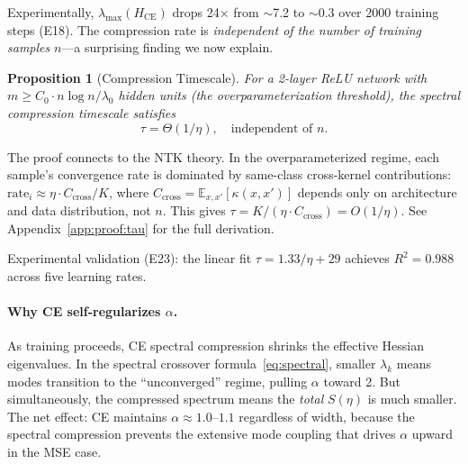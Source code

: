 \documentclass[11pt]{article}
\newcommand{\expect}{\mathbb{E}}
\newcommand{\lr}{\eta}                    %
\newcommand{\drexp}{\alpha}               %
\newcommand{\imbal}{S}                    %
\newcommand{\hwidth}{m}                   %
\newcommand{\nsamples}{n}                 %
\newcommand{\nclasses}{K}                 %
\newcommand{\spectau}{\tau}               %
\newtheorem{proposition}[theorem]{Proposition}
\theoremstyle{definition}
\theoremstyle{remark}
\begin{document}
Experimentally, $\lambda_{\max}(H_{\text{CE}})$ drops 24$\times$ from $\sim$7.2 to $\sim$0.3 over 2000 training steps (E18). The compression rate is \emph{independent of the number of training samples} $\nsamples$---a surprising finding we now explain.

\begin{proposition}[Compression Timescale]\label{prop:tau}
For a 2-layer ReLU network with $\hwidth \geq C_0 \cdot \nsamples \log\nsamples / \lambda_0$ hidden units (the overparameterization threshold), the spectral compression timescale satisfies
\begin{equation}\label{eq:tau}
    \spectau = \Theta(1/\lr), \quad \text{independent of } \nsamples.
\end{equation}
\end{proposition}

The proof connects to the NTK theory. In the overparameterized regime, each sample's convergence rate is dominated by same-class cross-kernel contributions: $\text{rate}_i \approx \lr \cdot C_{\text{cross}}/\nclasses$, where $C_{\text{cross}} = \expect_{x,x'}[\kappa(x,x')]$ depends only on architecture and data distribution, not $\nsamples$. This gives $\spectau = \nclasses/(\lr \cdot C_{\text{cross}}) = O(1/\lr)$. See Appendix~\ref{app:proof:tau} for the full derivation.

Experimental validation (E23): the linear fit $\spectau = 1.33/\lr + 29$ achieves $R^2 = 0.988$ across five learning rates.

\paragraph{Why CE self-regularizes $\drexp$.}
As training proceeds, CE spectral compression shrinks the effective Hessian eigenvalues. In the spectral crossover formula~\eqref{eq:spectral}, smaller $\lambda_k$ means modes transition to the ``unconverged'' regime, pulling $\drexp$ toward 2. But simultaneously, the compressed spectrum means the \emph{total} $\imbal(\lr)$ is much smaller. The net effect: CE maintains $\drexp \approx 1.0$--$1.1$ regardless of width, because the spectral compression prevents the extensive mode coupling that drives $\drexp$ upward in the MSE case.
\end{document}
